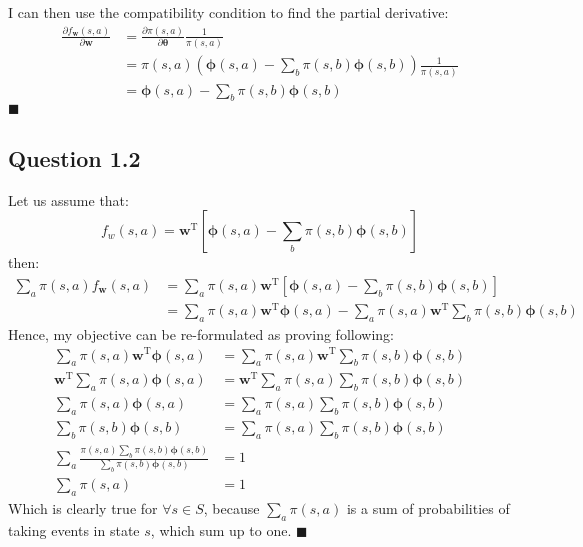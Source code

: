 \documentclass[a4paper]{article}
\newcommand*{\QEDA}{\hfill\ensuremath{\blacksquare}}%
\newcommand*{\bs}[1]{\boldsymbol{#1}}
\begin{document}
I can then use the compatibility condition to find the partial derivative:
\begin{align*}
  \frac{\partial f_{\boldsymbol{w}}(s, a)}{\partial \boldsymbol{w}}
    &=\frac{\partial \pi(s, a)}{\partial \boldsymbol{\theta}} \frac{1}{\pi(s, a)}\\
    &= \pi(s, a)\left(\boldsymbol{\phi}(s, a)-\sum_{b}\pi(s, b)\boldsymbol{\phi}(s, b)\right)
  \frac{1}{\pi(s, a)}\\
  &=\boldsymbol{\phi}(s, a)-\sum_{b}\pi(s, b)\boldsymbol{\phi}(s, b)
\end{align*}
\QEDA

\subsection*{Question 1.2}
\label{subsec:12}
Let us assume that:
\[
f_{w}(s, a)=\boldsymbol{w}^{\mathrm{T}}\left[\bs{\phi}(s, a)-\sum_{b} \pi(s, b) \bs{\phi}(s, b)\right]
\]
then:
\begin{align*}
  \sum_{a} \pi(s, a) f_{\boldsymbol{w}}(s, a)
  &=
  \sum_{a} \pi(s, a) \boldsymbol{w}^{\mathrm{T}}
  \left[\bs{\phi}(s, a)-\sum_{b} \pi(s, b) \bs{\phi}(s, b)\right]\\
  &=
  \sum_{a} \pi(s, a) \boldsymbol{w}^{\mathrm{T}}
  \bs{\phi}(s, a)-
  \sum_{a} \pi(s, a) \boldsymbol{w}^{\mathrm{T}}
  \sum_{b} \pi(s, b) \bs{\phi}(s, b)
\end{align*}
Hence, my objective can be re-formulated as proving following:
\begin{align*}
  \sum_{a} \pi(s, a) \boldsymbol{w}^{\mathrm{T}}\bs{\phi}(s, a)
  &=
  \sum_{a} \pi(s, a) \boldsymbol{w}^{\mathrm{T}}\sum_{b} \pi(s, b) \bs{\phi}(s, b)\\
  \boldsymbol{w}^{\mathrm{T}} \sum_{a} \pi(s, a) \bs{\phi}(s, a)
  &=
   \boldsymbol{w}^{\mathrm{T}}\sum_{a} \pi(s, a)\sum_{b} \pi(s, b) \bs{\phi}(s, b)\\
   \sum_{a} \pi(s, a) \bs{\phi}(s, a)
  &=
   \sum_{a} \pi(s, a)\sum_{b} \pi(s, b) \bs{\phi}(s, b)\\
   \sum_{b} \pi(s, b) \bs{\phi}(s, b)
  &=
   \sum_{a} \pi(s, a)\sum_{b} \pi(s, b) \bs{\phi}(s, b)\\
   \sum_{a} \frac{\pi(s, a)\sum_{b} \pi(s, b) \bs{\phi}(s, b)}
       {\sum_{b} \pi(s, b) \bs{\phi}(s, b)}
   &=1\\
   \sum_{a}\pi(s, a) &= 1
\end{align*}
Which is clearly true for $\forall s \in S$, because 
   $\sum_{a}\pi(s, a)$ is a sum of probabilities of taking events in state $s$,
which sum up to one.
\QEDA
\end{document}
